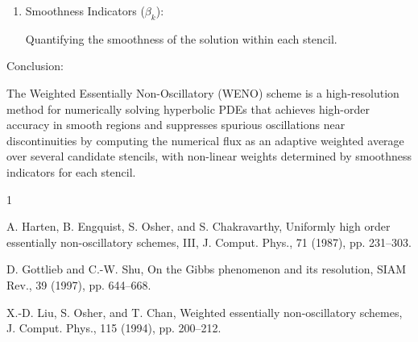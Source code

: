 \documentclass[12pt,a4paper]{article}
\begin{document}
\begin{description}
\begin{enumerate}
\item  Smoothness Indicators ($\beta_k$):

 Quantifying the smoothness of the solution within each stencil.

\end{enumerate}

\item Conclusion:

The Weighted Essentially Non-Oscillatory (WENO) scheme is a high-resolution method for numerically solving hyperbolic PDEs that achieves high-order accuracy in smooth regions and suppresses spurious oscillations near discontinuities by computing the numerical flux as an adaptive weighted average over several candidate stencils, with non-linear weights determined by smoothness indicators for each stencil.

\end{description}

\begin{thebibliography}{1}

A. Harten, B. Engquist, S. Osher, and S. Chakravarthy, Uniformly high order essentially non-oscillatory schemes, III, J. Comput. Phys., 71 (1987), pp. 231–303.

D. Gottlieb and C.-W. Shu, On the Gibbs phenomenon and its resolution, SIAM Rev., 39 (1997), pp. 644–668.

X.-D. Liu, S. Osher, and T. Chan, Weighted essentially non-oscillatory schemes, J. Comput. Phys., 115 (1994), pp. 200–212.
\end{thebibliography}
\end{document}
